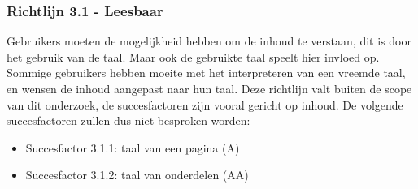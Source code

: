 \subsubsection{Richtlijn 3.1 - Leesbaar}
Gebruikers moeten de mogelijkheid hebben om de inhoud te verstaan, dit is door het gebruik van de taal. Maar ook de gebruikte taal speelt hier invloed op. Sommige gebruikers hebben moeite met het interpreteren van een vreemde taal, en wensen de inhoud aangepast naar hun taal. Deze richtlijn valt buiten de scope van dit onderzoek, de succesfactoren zijn vooral gericht op inhoud. De volgende succesfactoren zullen dus niet besproken worden: \begin{itemize}
    \item Succesfactor 3.1.1: taal van een pagina (A)
    \item Succesfactor 3.1.2: taal van onderdelen (AA)
\end{itemize}
